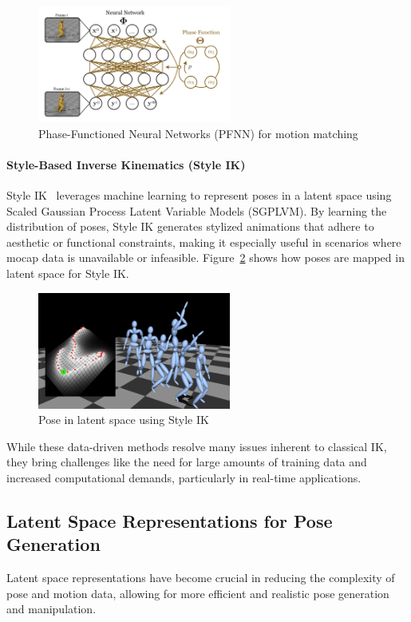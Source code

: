 \documentclass[../../main.tex]{subfiles}
\begin{document}
\begin{figure}
  \centering \includegraphics[width = 2.5in]{chapters/pose_correction/images/pfnn.png}
  \caption{Phase-Functioned Neural Networks (PFNN) for motion matching}
  \label{fig:pfnn}
\end{figure}

\paragraph{Style-Based Inverse Kinematics (Style IK)} Style IK~\cite{grochow2004style} leverages machine learning to represent poses in a latent space using Scaled Gaussian Process Latent Variable Models (SGPLVM). By learning the distribution of poses, Style IK generates stylized animations that adhere to aesthetic or functional constraints, making it especially useful in scenarios where mocap data is unavailable or infeasible. Figure~\ref{fig:style_ik} shows how poses are mapped in latent space for Style IK.

\begin{figure}
  \centering \includegraphics[width = 2.5in]{chapters/pose_correction/images/style_ik.png}
  \caption{Pose in latent space using Style IK}
  \label{fig:style_ik}
\end{figure}

While these data-driven methods resolve many issues inherent to classical IK, they bring challenges like the need for large amounts of training data and increased computational demands, particularly in real-time applications.

\subsection{Latent Space Representations for Pose Generation}
\label{ch:pose_correction:related_work:latent_space}
Latent space representations have become crucial in reducing the complexity of pose and motion data, allowing for more efficient and realistic pose generation and manipulation.
\end{document}

